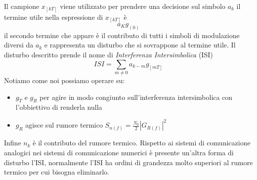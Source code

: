 \begin{itemize}
{\[                    \]
                    Il campione $x_{[kT]}$ viene utilizzato per prendere una decisione sul simbolo $a_k$ il termine utile nella espressione di $x_{[kT]}$
                    è 
                    \[
                        a_Kg_{(0)}
                    \]\label{ISI}
                    il secondo termine che appare è il contributo di tutti i simboli di modulazione diversi da $a_k$ e rappresenta un disturbo che si 
                    sovrappone al termine utile. Il disturbo descritto prende il nome di \emph{Interferenza Intersimbolica} (ISI)
                    \[
                        ISI =  \sum_{m\neq 0}a_{k-m}g_{[mT]}
                    \]
                    Notiamo come noi possiamo operare su:
                    \begin{itemize}
                        \item {
                            $g_T$ e $g_R$ per agire in modo congiunto sull'interferenza intersimbolica con l'obbiettivo di renderla nulla
                        }
                        \item {
                            $g_R$ agisce sul rumore termico $S_{n(f)} = \frac{N_0}{2} \left|G_{R(f)}\right|^2$
                        }
                    \end{itemize}
                    Infine $n_k$ è il contributo del rumore termico. Rispetto ai sistemi di comunicazione analogici nei sistemi di comunicazione numerici
                    è presente un'altra forma di disturbo l'ISI, normalmente l'ISI ha ordini di grandezza molto superiori al rumore termico per cui bisogna 
                    eliminarlo.
                }
            \end{itemize}
